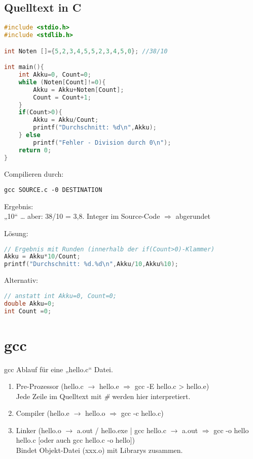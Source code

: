 \subsection{Quelltext in C}

\begin{lstlisting}[language=C]
#include <stdio.h>
#include <stdlib.h>

int Noten []={5,2,3,4,5,5,2,3,4,5,0}; //38/10

int main(){
	int Akku=0, Count=0;
	while (Noten[Count]!=0){
		Akku = Akku+Noten[Count];
		Count = Count+1;
	}
	if(Count>0){
		Akku = Akku/Count;
		printf("Durchschnitt: %d\n",Akku);
	} else
		printf("Fehler - Division durch 0\n");
	return 0;
}
\end{lstlisting}

Compilieren durch: 
\begin{lstlisting}
gcc SOURCE.c -0 DESTINATION
\end{lstlisting}

Ergebnis:\\
„10“ … aber: 38/10 = 3,8. Integer im Source-Code $\Rightarrow$ abgerundet

Lösung:
\begin{lstlisting}[language=C]
// Ergebnis mit Runden (innerhalb der if(Count>0)-Klammer)
Akku = Akku*10/Count;
printf("Durchschnitt: %d.%d\n",Akku/10,Akku%10);
\end{lstlisting}

Alternativ:
\begin{lstlisting}[language=C]
// anstatt int Akku=0, Count=0;
double Akku=0;
int Count =0;
\end{lstlisting}

\section{gcc}

gcc Ablauf für eine „hello.c“ Datei.

\begin{enumerate}
\item Pre-Prozessor (hello.c $\rightarrow$ hello.e $\Rightarrow$ gcc -E hello.c > hello.e) \\
Jede Zeile im Quelltext mit \emph{\#} werden hier interpretiert.
\item Compiler (hello.e $\rightarrow$ hello.o $\Rightarrow$ gcc -c hello.c)
\item Linker (hello.o $\rightarrow$ a.out / hello.exe | gcc hello.c $\rightarrow$ a.out $\Rightarrow$ gcc -o hello hello.c [oder auch gcc hello.c -o hello])\\
Bindet Objekt-Datei (xxx.o) mit Librarys zusammen.
\end{enumerate}

